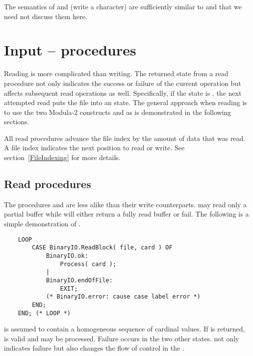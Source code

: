 The semantics of  and  (write a character)
are sufficiently similar to  and 
 that we need not discuss them here.


\section{Input --  procedures}

Reading is more complicated than writing.  The returned state from
a read procedure not only indicates the success or failure of the
current operation but affects subsequent read operations as well.
Specifically, if the state is , the 
next attempted read puts the file into an  state.
The general approach when reading is to use the two Modula-2 constructs
 and  as is demonstrated in the following
sections.

All read procedures advance the file index by the amount of data
that was read.  A file index indicates the next position to read or
write.  See section~\ref{FileIndexing} for more details.

\subsection{ Read procedures}

The procedures  and 
 are less
alike than their write counterparts.   may
read only a partial buffer while  will either
return a fully read buffer or fail.  The following is a simple
demonstration of .

\begin{verbatim}
    LOOP
        CASE BinaryIO.ReadBlock( file, card ) OF
            BinaryIO.ok:
                Process( card );
            |
            BinaryIO.endOfFile:
                EXIT;
            (* BinaryIO.error: cause case label error *)
        END;
    END; (* LOOP *)
\end{verbatim}

 is assumed to contain a homogeneous sequence of cardinal
values.  
If  is returned,  is valid and may be
processed.  Failure occurs in the two other states.  
not only indicates failure but also changes the flow of control in 
the .  


